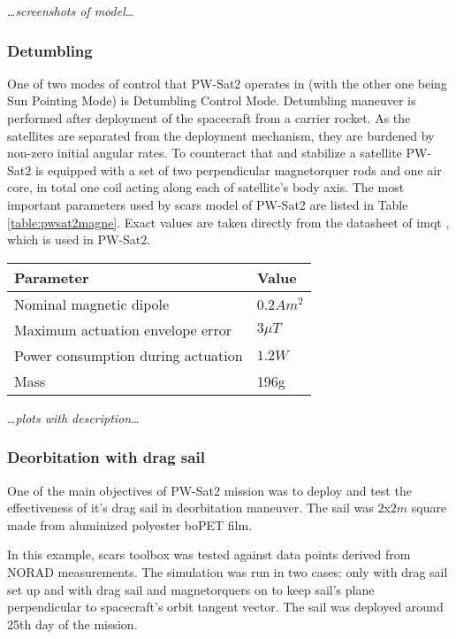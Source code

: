         \dots\textit{screenshots of model}\dots

        \subsubsection{Detumbling}
            One of two modes of control that PW-Sat2 operates in (with the other one being Sun Pointing Mode) is Detumbling Control Mode. Detumbling maneuver is performed after deployment of the spacecraft from a carrier rocket. As the satellites are separated from the deployment mechanism, they are burdened by non-zero initial angular rates. To counteract that and stabilize a satellite PW-Sat2 is equipped with a set of two perpendicular magnetorquer rods and one air core, in total one coil acting along each of satellite's body axis. The most important parameters used by \ac{scars} model of PW-Sat2 are listed in Table \ref{table:pwsat2magne}.\cite{pwsat2adcs} Exact values are taken directly from the datasheet of \ac{imqt} \cite{imqt-datasheet}, which is used in PW-Sat2.

                \begin{center}    
                    \small
                    \begin{tabular}{l l}
                        \textbf{Parameter} & \textbf{Value} \\ \hline
                        Nominal magnetic dipole & $0.2 Am^2$ \\
                        Maximum actuation envelope error & $3\mu T$ \\
                        Power consumption during actuation & $1.2W$ \\
                        Mass & 196g
                    \end{tabular}
                \end{center}\label{table:pwsat2magne}

                \dots\textit{plots with description}\dots

        \subsubsection{Deorbitation with drag sail}
            One of the main objectives of PW-Sat2 mission was to deploy and test the effectiveness of it's drag sail in deorbitation maneuver. The sail was  $2$x$2m$ square made from aluminized polyester boPET film\cite{pwsat2dt}.
            
            In this example, \ac{scars} toolbox was tested against data points derived from NORAD measurements. The simulation was run in two cases: only with drag sail set up and with drag sail and magnetorquers on to keep sail's plane perpendicular to spacecraft's orbit tangent vector. The sail was deployed around 25th day of the mission.
                         
